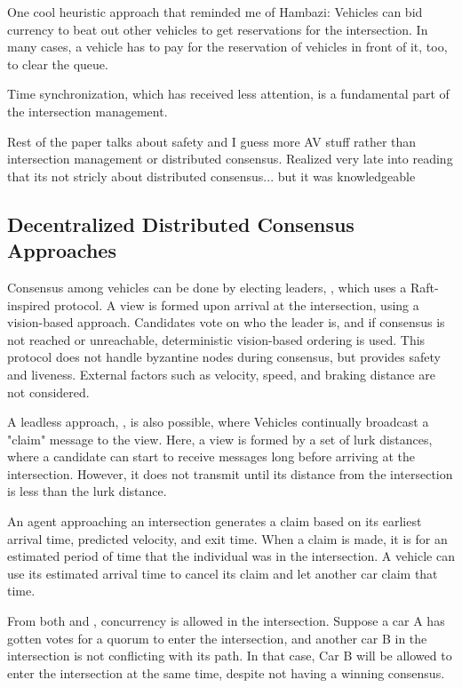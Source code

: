 \documentclass[fleqn,10pt]{olplainarticle}
\begin{document}
One cool heuristic approach that reminded me of Hambazi: Vehicles can bid currency to beat out other vehicles to get reservations for the intersection. In many cases, a vehicle has to pay for the reservation of vehicles in front of it, too, to clear the queue. \cite{Vasirani_2012}




Time synchronization, which has received less attention, is a fundamental part of the intersection management. 


Rest of the paper talks about safety and I guess more AV stuff rather than intersection management or distributed consensus.
Realized very late into reading that its not stricly about distributed consensus... but it was knowledgeable

\subsection{Decentralized Distributed Consensus Approaches}
Consensus among vehicles can be done by electing leaders, \cite{lee2025distributedconsensusalgorithmprioritizing}, which uses a Raft-inspired protocol. A view is formed upon arrival at the intersection, using a vision-based approach. 
Candidates vote on who the leader is, and if consensus is not reached or unreachable, deterministic vision-based ordering is used. This protocol does not handle byzantine nodes during consensus, but provides safety and liveness. External factors such as velocity, speed, and braking distance are not considered. 


A leadless approach, \cite{inproceedings}, is also possible, where Vehicles continually broadcast a "claim" message to the view. Here, a view is formed by a set of lurk distances, where a candidate can start to receive messages long before arriving at the intersection. However, it does not transmit until its distance from the intersection is less than the lurk distance.  

An agent approaching an intersection generates a claim based on its earliest arrival time, predicted velocity, and exit time. When a claim is made, it is for an estimated period of time that the individual was in the intersection. 
A vehicle can use its estimated arrival time to cancel its claim and let another car claim that time. 

From both \cite{inproceedings} and \cite{lee2025distributedconsensusalgorithmprioritizing}, concurrency is allowed in the intersection. Suppose a car A has gotten votes for a quorum to enter the intersection, and another car B in the intersection is not conflicting with its path. In that case, Car B will be allowed to enter the intersection at the same time, despite not having a winning consensus. 







\end{document}
